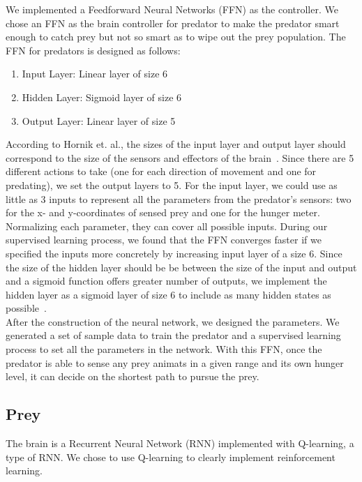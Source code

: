 \documentclass[10pt,conference,letterpaper,doublecolumn]{IEEEtran}
\begin{document}
We implemented a Feedforward Neural Networks (FFN) as the controller. We chose an FFN as the brain controller for predator to make the predator smart enough to catch prey but not so smart as to wipe out the prey population. The FFN for predators is designed as follows:

\begin{enumerate}
\item Input Layer: Linear layer of size 6
\item Hidden Layer: Sigmoid layer of size 6 
\item Output Layer: Linear layer of size 5 
\end{enumerate}

According to Hornik et. al., the sizes of the input layer and output layer should correspond to the size of the sensors and effectors of the brain~\cite{FFN}. Since there are 5 different actions to take (one for each direction of movement and one for predating), we set the output layers to 5. For the input layer, we could use as little as 3 inputs to represent all the parameters from the predator's sensors: two for the x- and y-coordinates of sensed prey and one for the hunger meter. Normalizing each parameter, they can cover all possible inputs. During our supervised learning process, we found that the FFN converges faster if we specified the inputs more concretely by increasing input layer of a size 6. Since the size of the hidden layer should be be between the size of the input and output and a sigmoid function offers greater number of outputs, we implement the hidden layer as a sigmoid layer of size 6 to include as many hidden states as possible~\cite{FFN2}.\\

After the construction of the neural network, we designed the parameters. We generated a set of sample data to train the predator and a supervised learning process to set all the parameters in the network. With this FFN, once the predator is able to sense any prey animats in a given range and its own hunger level, it can decide on the shortest path to pursue the prey.

\subsection{Prey}
The brain is a Recurrent Neural Network (RNN) implemented with Q-learning, a type of RNN. We chose to use Q-learning to clearly implement reinforcement learning.
\end{document}
